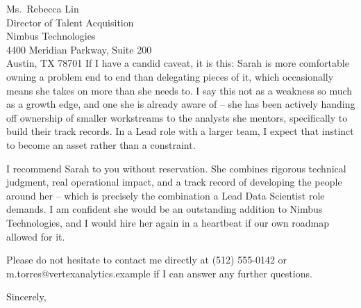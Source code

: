 \documentclass[11pt]{letter}
\begin{document}
\begin{letter}{Ms.\ Rebecca Lin\\ Director of Talent Acquisition\\ Nimbus Technologies\\ 4400 Meridian Parkway, Suite 200\\ Austin, TX 78701}
If I have a candid caveat, it is this: Sarah is more comfortable owning a problem end to end than delegating pieces of it, which occasionally means she takes on more than she needs to. I say this not as a weakness so much as a growth edge, and one she is already aware of -- she has been actively handing off ownership of smaller workstreams to the analysts she mentors, specifically to build their track records. In a Lead role with a larger team, I expect that instinct to become an asset rather than a constraint.

I recommend Sarah to you without reservation. She combines rigorous technical judgment, real operational impact, and a track record of developing the people around her -- which is precisely the combination a Lead Data Scientist role demands. I am confident she would be an outstanding addition to Nimbus Technologies, and I would hire her again in a heartbeat if our own roadmap allowed for it.

Please do not hesitate to contact me directly at (512) 555-0142 or m.torres@vertexanalytics.example if I can answer any further questions.

\closing{Sincerely,}


\end{letter}
\end{document}
